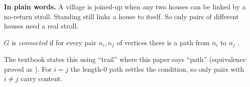 \plainstart\textbf{In plain words.} A village is joined-up when any two houses can be linked by a no-return stroll. Standing still links a house to itself. So only pairs of different houses need a real stroll.\plainend
\begin{definition}\label{def:connected}
$G$ is \emph{connected} if for every pair $n_i, n_j$ of vertices there is a path from $n_i$ to $n_j$ \cite[Definition 2.1.1, p.~48]{petrosyan_graph_theory}.
\end{definition}

The textbook states this using ``trail'' where this paper says ``path'' (equivalence proved as ). For $i = j$ the length-$0$ path settles the condition, so only pairs with $i \ne j$ carry content.
